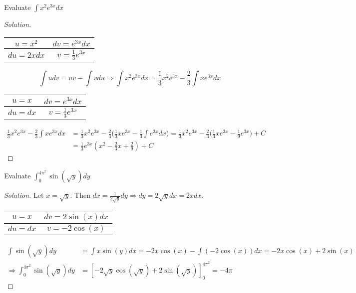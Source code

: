 \documentclass[crop=false,class=book,oneside]{standalone}
\begin{document}
\begin{problem}
Evaluate $\int x^{2}e^{3x}dx$
\end{problem}
\begin{proof}[Solution]
\
\begin{table}[H]
    \centering
    \begin{tabular}{|c|c|}
        \hline
        $u=x^{2}$&$dv=e^{3x}dx$\\
        \hline
        $du=2xdx$&$v=\frac{1}{3}e^{3x}$\\
        \hline
    \end{tabular}
\end{table}
\begin{equation*}
    \int udv=uv-\int vdu\Rightarrow \int x^{2}e^{3x}dx=\frac{1}{3}x^{2}e^{3x}-\frac{2}{3}\int xe^{3x}dx
\end{equation*}
\begin{table}[H]
    \centering
    \begin{tabular}{|c|c|}
        \hline
        $u=x$&$dv=e^{3x}dx$\\
        \hline
        $du=dx$&$v=\frac{1}{3}e^{3x}$\\
        \hline
    \end{tabular}
\end{table}
\begin{align*}
    \frac{1}{3}x^{2}e^{3x}-\frac{2}{3}\int xe^{3x}dx&=\frac{1}{3}x^{2}e^{3x}-\frac{2}{3}\big(\frac{1}{3}xe^{3x}-\frac{1}{3}\int e^{3x}dx\big)=\frac{1}{3}x^{2}e^{3x}-\frac{2}{3}\big(\frac{1}{3}xe^{3x}-\frac{1}{9}e^{3x}\big)+C\\
    &=\frac{1}{3}e^{3x}(x^{2}-\frac{2}{3}x+\frac{2}{9})+C
\end{align*}
\end{proof}
\begin{problem}
Evaluate $\int_{0}^{4\pi^{2}}\sin(\sqrt{y})dy$
\end{problem}
\begin{proof}[Solution]
Let $x=\sqrt{y}$. Then $dx=\frac{1}{2\sqrt{y}}dy\Rightarrow dy=2\sqrt{y}dx=2xdx$.
\begin{table}[H]
    \centering
    \begin{tabular}{|c|c|}
        \hline
        $u=x$&$dv=2\sin(x)dx$\\
        \hline
        $du=dx$&$v=-2\cos(x)$\\
        \hline
    \end{tabular}
\end{table}
\begin{align*}
    \int\sin(\sqrt{y})dy&=\int x\sin(y)dx=-2x\cos(x)-\int(-2\cos(x))dx=-2x\cos(x)+2\sin(x)\\
    \Rightarrow \int_{0}^{4\pi^{2}}\sin(\sqrt{y})dy&=[-2\sqrt{y}\cos(\sqrt{y})+2\sin(\sqrt{y})]_{0}^{4\pi^{2}}=-4\pi
\end{align*}
\end{proof}
\end{document}
